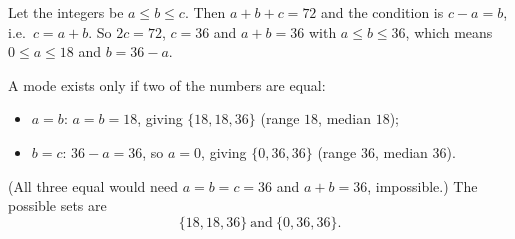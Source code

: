 Let the integers be $a\le b\le c$. Then $a+b+c=72$ and the condition is $c-a=b$, i.e.\ $c=a+b$. So $2c=72$, $c=36$ and $a+b=36$ with $a\le b\le36$, which means $0\le a\le18$ and $b=36-a$.

A mode exists only if two of the numbers are equal:
\begin{itemize}
\item $a=b$: $a=b=18$, giving $\{18,18,36\}$ (range $18$, median $18$);
\item $b=c$: $36-a=36$, so $a=0$, giving $\{0,36,36\}$ (range $36$, median $36$).
\end{itemize}
(All three equal would need $a=b=c=36$ and $a+b=36$, impossible.) The possible sets are
\[
\boxed{\{18,18,36\}\ \text{and}\ \{0,36,36\}}.
\]

